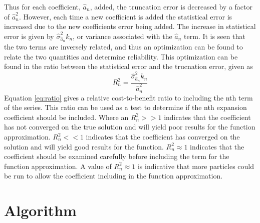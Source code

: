 \documentclass[10tma4paper]{article}
\begin{document}
Thus for each coefficient, $\hat{a}_{n}$, added, the truncation error is decreased by a factor of $\hat{a}_{n}^2$. However, each time a new coefficient is added the statistical error is increased due to the new coefficients error being added. The increase in statistical error is given by $\hat{\sigma}_{\hat{a}_{n}}^2k_{n}$, or variance associated with the $\hat{a}_{n}$ term. It is seen that the two terms are inversely related, and thus an optimization can be found to relate the two quantities and determine reliability. This optimization can be found in the ratio between the statistical error and the trucnation error, given as
\begin{equation}\label{eq:ratio}
R_{n}^2=\frac{\hat{\sigma}_{\hat{a}_{n}}^2k_{n}}{\hat{a}_{n}^2}
\end{equation}
Equation \eqref{eq:ratio} gives a relative cost-to-benefit ratio to including the nth term of the series. This ratio can be used as a test to determine if the nth expansion coefficient should be included. Where an $R_{n}^2>>1$ indicates that the coefficient has not converged on the true solution and will yield poor results for the function approximation. $R_{n}^2<<1$ indicates that the coefficient has converged on the solution and will yield good results for the function. $R_{n}^2\approx1$ indicates that the coefficient should be examined carefully before including the term for the function approximation. A value of $R_{n}^2\approx1$ is indicative that more particles could be run to allow the coefficient including in the function approximation.


\section{Algorithm}\label{algorith}
\end{document}
